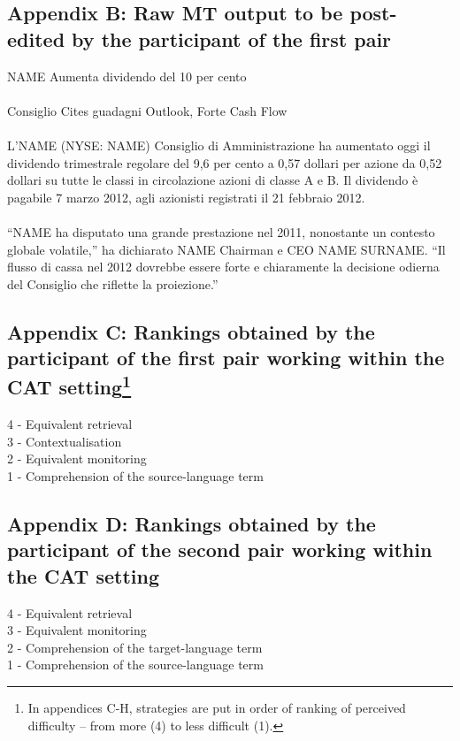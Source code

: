 \documentclass[output=paper]{LSP/langsci}
\begin{document}
\subsection*{Appendix B: Raw MT output to be post-edited by the participant of the first pair}

NAME Aumenta dividendo del 10 per cento \\ \\
Consiglio Cites guadagni Outlook, Forte Cash Flow \\ \\
L'NAME (NYSE: NAME) Consiglio di Amministrazione ha aumentato oggi il dividendo trimestrale regolare del 9,6 per cento a 0,57 dollari per azione da 0,52 dollari su tutte le classi in circolazione azioni di classe A e B. Il dividendo è pagabile 7 marzo 2012, agli azionisti registrati il 21 febbraio 2012. \\ \\
``NAME ha disputato una grande prestazione nel 2011, nonostante un contesto globale volatile,'' ha dichiarato NAME Chairman e CEO NAME SURNAME. ``Il flusso di cassa nel 2012 dovrebbe essere forte e chiaramente la decisione odierna del Consiglio che riflette la proiezione.''

\subsection*{Appendix C: Rankings obtained by the participant of the first pair working within the CAT setting\footnote{In appendices C-H, strategies are put in order of ranking of perceived difficulty -- from more (4) to less difficult (1).}}

4 - Equivalent retrieval \\
3 - Contextualisation \\
2 - Equivalent monitoring \\
1 - Comprehension of the source-language term

\subsection*{Appendix D: Rankings obtained by the participant of the second pair working within the CAT setting}

4 - Equivalent retrieval \\
3 - Equivalent monitoring \\
2 - Comprehension of the target-language term \\
1 - Comprehension of the source-language term
\end{document}
